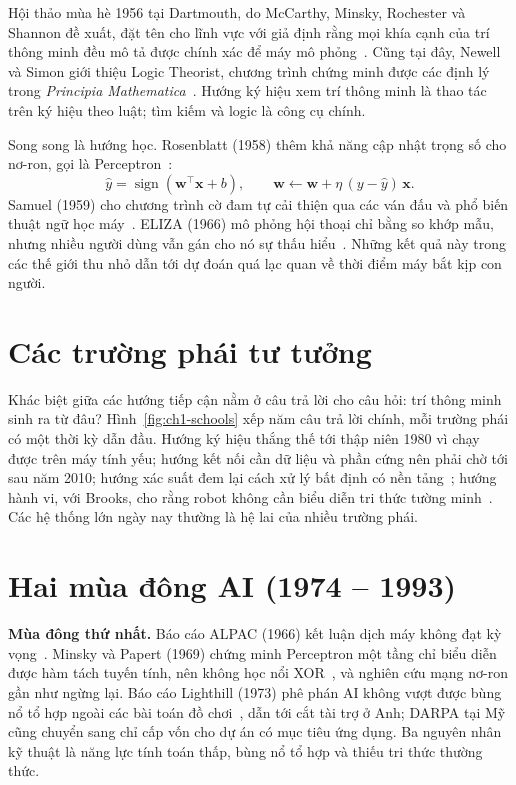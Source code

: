 Hội thảo mùa hè 1956 tại Dartmouth, do McCarthy, Minsky, Rochester và Shannon đề xuất, đặt tên cho lĩnh vực với giả định rằng
mọi khía cạnh của trí thông minh đều mô tả được chính xác để máy mô phỏng~\cite{ch1:mccarthy2006}. Cũng tại đây, Newell và Simon
giới thiệu Logic Theorist, chương trình chứng minh được các định lý trong \emph{Principia Mathematica}~\cite{ch1:newell1956}.
Hướng ký hiệu xem trí thông minh là thao tác trên ký hiệu theo luật; tìm kiếm và logic là công cụ chính.

Song song là hướng học. Rosenblatt (1958) thêm khả năng cập nhật trọng số cho nơ-ron, gọi là Perceptron~\cite{ch1:rosenblatt1958}:
\begin{equation}
  \hat y=\operatorname{sign}(\mathbf{w}^\top\mathbf{x}+b),\qquad \mathbf{w}\leftarrow\mathbf{w}+\eta\,(y-\hat y)\,\mathbf{x}.
\end{equation}
Samuel (1959) cho chương trình cờ đam tự cải thiện qua các ván đấu và phổ biến thuật ngữ học máy~\cite{ch1:samuel1959}.
ELIZA (1966) mô phỏng hội thoại chỉ bằng so khớp mẫu, nhưng nhiều người dùng vẫn gán cho nó sự thấu hiểu~\cite{ch1:weizenbaum1966}.
Những kết quả này trong các thế giới thu nhỏ dẫn tới dự đoán quá lạc quan về thời điểm máy bắt kịp con người.

\section{Các trường phái tư tưởng}

Khác biệt giữa các hướng tiếp cận nằm ở câu trả lời cho câu hỏi: trí thông minh sinh ra từ đâu? Hình~\ref{fig:ch1-schools} xếp
năm câu trả lời chính, mỗi trường phái có một thời kỳ dẫn đầu. Hướng ký hiệu thắng thế tới thập niên 1980 vì chạy được trên máy
tính yếu; hướng kết nối cần dữ liệu và phần cứng nên phải chờ tới sau năm 2010; hướng xác suất đem lại cách xử lý bất định có
nền tảng~\cite{ch1:pearl1988}; hướng hành vi, với Brooks, cho rằng robot không cần biểu diễn tri thức tường minh~\cite{ch1:brooks1991}.
Các hệ thống lớn ngày nay thường là hệ lai của nhiều trường phái.


\section{Hai mùa đông AI (1974 -- 1993)}

\textbf{Mùa đông thứ nhất.} Báo cáo ALPAC (1966) kết luận dịch máy không đạt kỳ vọng~\cite{ch1:alpac1966}. Minsky và Papert (1969)
chứng minh Perceptron một tầng chỉ biểu diễn được hàm tách tuyến tính, nên không học nổi XOR~\cite{ch1:minsky1969}, và nghiên cứu
mạng nơ-ron gần như ngừng lại. Báo cáo Lighthill (1973) phê phán AI không vượt được bùng nổ tổ hợp ngoài các bài toán đồ
chơi~\cite{ch1:lighthill1973}, dẫn tới cắt tài trợ ở Anh; DARPA tại Mỹ cũng chuyển sang chỉ cấp vốn cho dự án có mục tiêu ứng dụng.
Ba nguyên nhân kỹ thuật là năng lực tính toán thấp, bùng nổ tổ hợp và thiếu tri thức thường thức.

